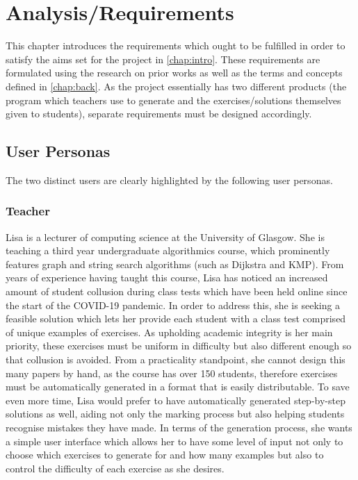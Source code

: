 \documentclass{l4proj}
\begin{document}
\chapter{Analysis/Requirements}
\label{chap:req}

This chapter introduces the requirements which ought to be fulfilled in order to satisfy the aims set for the project in \autoref{chap:intro}. These requirements are formulated using the research on prior works as well as the terms and concepts defined in \autoref{chap:back}. As the project essentially has two different products (the program which teachers use to generate and the exercises/solutions themselves given to students), separate requirements must be designed accordingly.
\section{User Personas}

The two distinct users are clearly highlighted by the following user personas.

\subsection{Teacher}

Lisa is a lecturer of computing science at the University of Glasgow. She is teaching a third year undergraduate algorithmics course, which prominently features graph and string search algorithms (such as Dijkstra and KMP). From years of experience having taught this course, Lisa has noticed an increased amount of student collusion during class tests which have been held online since the start of the COVID-19 pandemic. In order to address this, she is seeking a feasible solution which lets her provide each student with a class test comprised of unique examples of exercises. As upholding academic integrity is her main priority, these exercises must be uniform in difficulty but also different enough so that collusion is avoided. From a practicality standpoint, she cannot design this many papers by hand, as the course has over 150 students, therefore exercises must be automatically generated in a format that is easily distributable. To save even more time, Lisa would prefer to have automatically generated step-by-step solutions as well, aiding not only the marking process but also helping students recognise mistakes they have made. In terms of the generation process, she wants a simple user interface which allows her to have some level of input not only to choose which exercises to generate for and how many examples but also to control the difficulty of each exercise as she desires.
\end{document}

